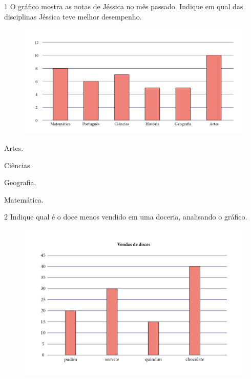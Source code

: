 \num{1} O gráfico mostra as notas de Jéssica no mês passado. Indique em
qual das disciplinas Jéssica teve melhor desempenho.

\begin{figure}[htpb!]
\includegraphics[width=\textwidth]{./media/image100.png}
\end{figure}

\begin{escolha}[itemsep=-5pt]
\item Artes.

\item Ciências.

\item Geografia.

\item Matemática.
\end{escolha}

\num{2} Indique qual é o doce menos vendido em uma doceria, analisando o gráfico.

\begin{figure}[htpb!]
\includegraphics[width=\textwidth]{./media/image101.png}
\end{figure}


